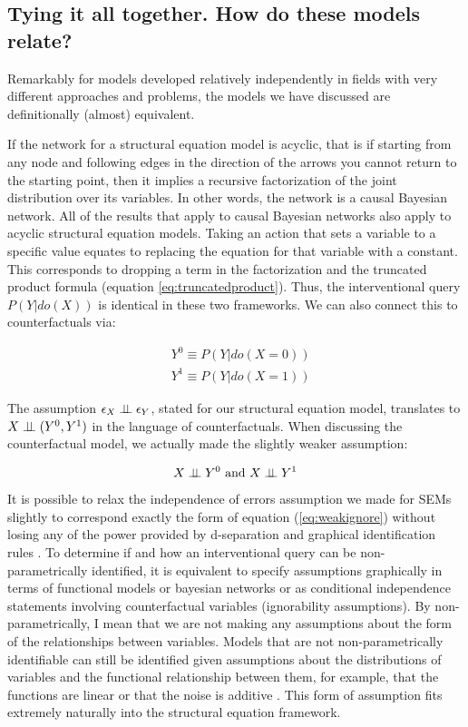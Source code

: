 \documentclass[11pt,a4paper]{article}
\begin{document}
\subsection{Tying it all together. How do these models relate?}

Remarkably for models developed relatively independently in fields with very different approaches and problems, the models we have discussed are definitionally (almost) equivalent. 

If the network for a structural equation model is acyclic, that is if starting from any node and following edges in the direction of the arrows you cannot return to the starting point, then it implies a recursive factorization of the joint distribution over its variables. In other words, the network is a causal Bayesian network. All of the results that apply to causal Bayesian networks also apply to acyclic structural equation models.  Taking an action that sets a variable to a specific value equates to replacing the equation for that variable with a constant. This corresponds to dropping a term in the factorization and the truncated product formula (equation \ref{eq:truncatedproduct}). Thus, the interventional query $P(Y|do(X))$ is identical in these two frameworks. We can also connect this to counterfactuals via:

\begin{equation}
\begin{aligned}
&Y^{0} \equiv P(Y|do(X=0)) \\
&Y^{1} \equiv P(Y|do(X=1))
\end{aligned}
\end{equation}

The assumption $\epsilon_{X} \perp\!\!\!\perp \epsilon_{Y}$, stated for our structural equation model, translates to $X \perp\!\!\!\perp (Y^{0},Y^{1})$ in the language of counterfactuals. When discussing the counterfactual model, we actually made the slightly weaker assumption:

\begin{equation}
\label{eq:weakignore}
X \perp\!\!\!\perp Y^{0} \text{ and } X \perp\!\!\!\perp Y^{1}
\end{equation}

It is possible to relax the independence of errors assumption we made for SEMs slightly to correspond exactly the form of equation (\ref{eq:weakignore}) without losing any of the power provided by d-separation and graphical identification rules \cite{Richardson2013}. To determine if and how an interventional query can be non-parametrically identified, it is equivalent to specify assumptions graphically in terms of functional models or bayesian networks or as conditional independence statements involving counterfactual variables (ignorability assumptions). By non-parametrically, I mean that we are not making any assumptions about the form of the relationships between variables. Models that are not non-parametrically identifiable can still be identified given assumptions about the distributions of variables and the functional relationship between them, for example, that the functions are linear or that the noise is additive \cite{Peters2014}. This form of assumption fits extremely naturally into the structural equation framework. 
\end{document}
